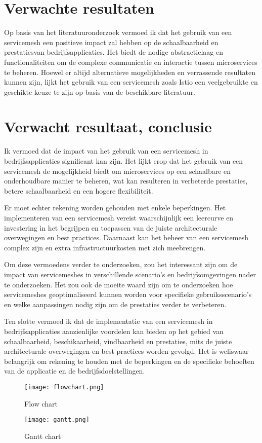 \section{Verwachte resultaten}%
\label{sec:verwachte-resultaten}

Op basis van het literatuuronderzoek vermoed ik dat het gebruik van een servicemesh een positieve impact zal hebben op de schaalbaarheid en prestatiesvan bedrijfsapplicaties. Het biedt de nodige abstractielaag en functionaliteiten om de complexe communicatie en interactie tussen microservices te beheren. Hoewel er altijd alternatieve mogelijkheden en verrassende resultaten kunnen zijn, lijkt het gebruik van een servicemesh zoals Istio een veelgebruikte en geschikte keuze te zijn op basis van de beschikbare literatuur.

\section{Verwacht resultaat, conclusie}%
\label{sec:verwachte_resultaten}

Ik vermoed dat de impact van het gebruik van een servicemesh in bedrijfsapplicaties significant kan zijn. Het lijkt erop dat het gebruik van een servicemesh de mogelijkheid biedt om microservices op een schaalbare en onderhoudbare manier te beheren, wat kan resulteren in verbeterde prestaties, betere schaalbaarheid en een hogere flexibiliteit.

Er moet echter rekening worden gehouden met enkele beperkingen. Het implementeren van een servicemesh vereist waarschijnlijk een leercurve en investering in het begrijpen en toepassen van de juiste architecturale overwegingen en best practices. Daarnaast kan het beheer van een servicemesh complex zijn en extra infrastructuurkosten met zich meebrengen.

Om deze vermoedens verder te onderzoeken, zou het interessant zijn om de impact van servicemeshes in verschillende scenario's en bedrijfsomgevingen nader te onderzoeken. Het zou ook de moeite waard zijn om te onderzoeken hoe servicemeshes geoptimaliseerd kunnen worden voor specifieke gebruiksscenario's en welke aanpassingen nodig zijn om de prestaties verder te verbeteren.

Ten slotte vermoed ik dat de implementatie van een servicemesh in bedrijfsapplicaties aanzienlijke voordelen kan bieden op het gebied van schaalbaarheid, beschikaarheid, vindbaarheid en prestaties, mits de juiste architecturale overwegingen en best practices worden gevolgd. Het is weliswaar belangrijk om rekening te houden met de beperkingen en de specifieke behoeften van de applicatie en de bedrijfsdoelstellingen.

\begin{figure*}[t]   
	\centering   
	\texttt{[image: flowchart.png]}  
	\caption{Flow chart}
	\label{fig:flowchart}				 
\end{figure*} 
\begin{figure*}[t]   
	\centering   
	\texttt{[image: gantt.png]}   
	\caption{Gantt chart}	
	\label{fig:gantt}	
\end{figure*} 